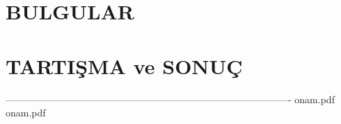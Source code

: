 \documentclass[11pt, a4paper, oneside]{./Packages_donottouch/Thesis} %
\begin{document}
\chapter{BULGULAR} %
\label{SS} %

	
\newpage
\chapter{TARTIŞMA ve SONUÇ} %
\label{STS} %
 
\cleardoublepage
	
	
\label{Bibliography}
\addtotoc{\bibname}
% 
%
%
%
	
	----------------------------------------------------------------------------------------
\clearpage
{}
 {onam.pdf} %
\clearpage
 {onam.pdf} %
	\cleardoublepage
	\backmatter
	
\end{document}

